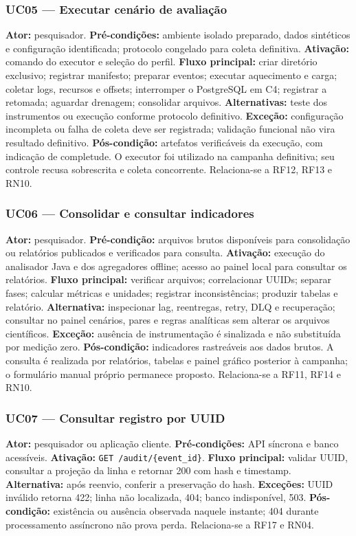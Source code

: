 \subsubsection{UC05 --- Executar cenário de avaliação}
\textbf{Ator:} pesquisador.
\textbf{Pré-condições:} ambiente isolado preparado, dados sintéticos e configuração identificada; protocolo congelado para coleta definitiva.
\textbf{Ativação:} comando do executor e seleção do perfil.
\textbf{Fluxo principal:} criar diretório exclusivo; registrar manifesto; preparar eventos; executar aquecimento e carga; coletar logs, recursos e offsets; interromper o PostgreSQL em C4; registrar a retomada; aguardar drenagem; consolidar arquivos.
\textbf{Alternativas:} teste dos instrumentos ou execução conforme protocolo definitivo.
\textbf{Exceção:} configuração incompleta ou falha de coleta deve ser registrada; validação funcional não vira resultado definitivo.
\textbf{Pós-condição:} artefatos verificáveis da execução, com indicação de completude. O executor foi utilizado na campanha definitiva; seu controle recusa sobrescrita e coleta concorrente. Relaciona-se a RF12, RF13 e RN10.

\subsubsection{UC06 --- Consolidar e consultar indicadores}
\textbf{Ator:} pesquisador.
\textbf{Pré-condição:} arquivos brutos disponíveis para consolidação ou relatórios publicados e verificados para consulta.
\textbf{Ativação:} execução do analisador Java e dos agregadores offline; acesso ao painel local para consultar os relatórios.
\textbf{Fluxo principal:} verificar arquivos; correlacionar UUIDs; separar fases; calcular métricas e unidades; registrar inconsistências; produzir tabelas e relatório.
\textbf{Alternativa:} inspecionar lag, reentregas, retry, DLQ e recuperação; consultar no painel cenários, pares e regras analíticas sem alterar os arquivos científicos.
\textbf{Exceção:} ausência de instrumentação é sinalizada e não substituída por medição zero.
\textbf{Pós-condição:} indicadores rastreáveis aos dados brutos. A consulta é realizada por relatórios, tabelas e painel gráfico posterior à campanha; o formulário manual próprio permanece proposto. Relaciona-se a RF11, RF14 e RN10.

\subsubsection{UC07 --- Consultar registro por UUID}
\textbf{Ator:} pesquisador ou aplicação cliente.
\textbf{Pré-condições:} API síncrona e banco acessíveis.
\textbf{Ativação:} \texttt{GET /audit/\{event\_id\}}.
\textbf{Fluxo principal:} validar UUID, consultar a projeção da linha e retornar 200 com hash e timestamp.
\textbf{Alternativa:} após reenvio, conferir a preservação do hash.
\textbf{Exceções:} UUID inválido retorna 422; linha não localizada, 404; banco indisponível, 503.
\textbf{Pós-condição:} existência ou ausência observada naquele instante; 404 durante processamento assíncrono não prova perda. Relaciona-se a RF17 e RN04.

